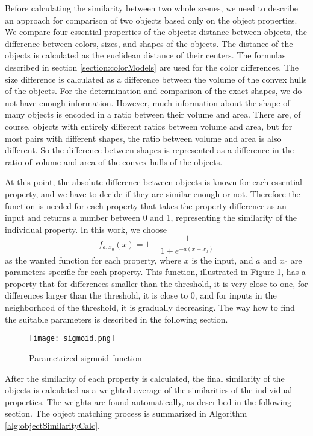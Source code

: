 Before calculating the similarity between two whole scenes, we need to describe an approach for comparison of two objects based only on the object properties. We compare four essential properties of the objects: distance between objects, the difference between colors, sizes, and shapes of the objects. The distance of the objects is calculated as the euclidean distance of their centers. The formulas described in section \ref{section:colorModels} are used for the color differences. The size difference is calculated as a difference between the volume of the convex hulls of the objects. For the determination and comparison of the exact shapes, we do not have enough information. However, much information about the shape of many objects is encoded in a ratio between their volume and area. There are, of course, objects with entirely different ratios between volume and area, but for most pairs with different shapes, the ratio between volume and area is also different. So the difference between shapes is represented as a difference in the ratio of volume and area of the convex hulls of the objects.\par
At this point, the absolute difference between objects is known for each essential property, and we have to decide if they are similar enough or not. Therefore the function is needed for each property that takes the property difference as an input and returns a number between 0 and 1, representing the similarity of the individual property. In this work, we choose
$$
    f_{a,x_0}(x) = 1 - \frac{1}{1 + e^{-a(x-x_0)}}
$$
as the wanted function for each property, where $x$ is the input, and $a$ and $x_0$ are parameters specific for each property. This function, illustrated in Figure \ref{fig:sigmoid}, has a property that for differences smaller than the threshold, it is very close to one, for differences larger than the threshold, it is close to 0, and for inputs in the neighborhood of the threshold, it is gradually decreasing. The way how to find the suitable parameters is described in the following section.\par

\begin{figure}[htpb]
    \centering
    \texttt{[image: sigmoid.png]}
    \caption{Parametrized sigmoid function} \label{fig:sigmoid}
\end{figure}

After the similarity of each property is calculated, the final similarity of the objects is calculated as a weighted average of the similarities of the individual properties. The weights are found automatically, as described in the following section. The object matching process is summarized in Algorithm \ref{alg:objectSimilarityCalc}.

